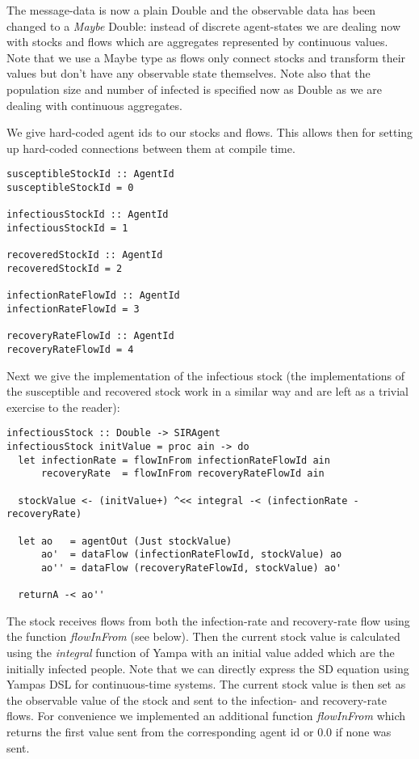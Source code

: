 The message-data is now a plain Double and the observable data has been changed to a \textit{Maybe} Double: instead of discrete agent-states we are dealing now with stocks and flows which are aggregates represented by continuous values. Note that we use a Maybe type as flows only connect stocks and transform their values but don't have any observable state themselves. Note also that the population size and number of infected is specified now as Double as we are dealing with continuous aggregates.

We give hard-coded agent ids to our stocks and flows. This allows then for setting up hard-coded connections between them at compile time.
\begin{verbatim}
susceptibleStockId :: AgentId
susceptibleStockId = 0

infectiousStockId :: AgentId
infectiousStockId = 1

recoveredStockId :: AgentId
recoveredStockId = 2

infectionRateFlowId :: AgentId
infectionRateFlowId = 3

recoveryRateFlowId :: AgentId
recoveryRateFlowId = 4
\end{verbatim}

Next we give the implementation of the infectious stock (the implementations of the susceptible and recovered stock work in a similar way and are left as a trivial exercise to the reader):

\begin{verbatim}
infectiousStock :: Double -> SIRAgent
infectiousStock initValue = proc ain -> do
  let infectionRate = flowInFrom infectionRateFlowId ain
      recoveryRate  = flowInFrom recoveryRateFlowId ain

  stockValue <- (initValue+) ^<< integral -< (infectionRate - recoveryRate)
  
  let ao   = agentOut (Just stockValue)
      ao'  = dataFlow (infectionRateFlowId, stockValue) ao
      ao'' = dataFlow (recoveryRateFlowId, stockValue) ao'
      
  returnA -< ao''
\end{verbatim}

The stock receives flows from both the infection-rate and recovery-rate flow using the function \textit{flowInFrom} (see below). Then the current stock value is calculated using the \textit{integral} function of Yampa with an initial value added which are the initially infected people. Note that we can directly express the SD equation using Yampas DSL for continuous-time systems. The current stock value is then set as the observable value of the stock and sent to the infection- and recovery-rate flows. For convenience we implemented an additional function \textit{flowInFrom} which returns the first value sent from the corresponding agent id or 0.0 if none was sent.

